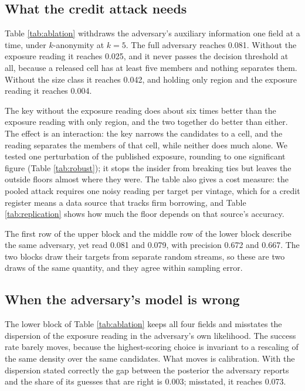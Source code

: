 \documentclass[11pt,a4paper]{article}
\theoremstyle{plain}
\theoremstyle{definition}
\theoremstyle{definition}
\theoremstyle{plain}
\begin{document}
\subsection{What the credit attack needs}\label{app:eval-extra}



Table \ref{tab:ablation} withdraws the adversary's auxiliary information one field
at a time, under $k$-anonymity at $k=5$. The full adversary reaches
0.081. Without the exposure reading it reaches
0.025, and it never passes the decision threshold at all,
because a released cell has at least five members and nothing separates them.
Without the size class it reaches 0.042, and holding only region and the
exposure reading it reaches 0.004.

The key without the exposure reading does about six times better than the
exposure reading with only region, and the two together do better than either.
The effect is an interaction: the key narrows the candidates to a cell, and the
reading separates the members of that cell, while neither does much alone. We
tested one perturbation of the published exposure, rounding to one significant
figure (Table \ref{tab:robust}); it stops the insider from breaking ties but
leaves the outside floors almost where they were. The table also gives a cost
measure: the pooled attack requires one noisy reading per target per vintage,
which for a credit register means a data source that tracks firm borrowing, and
Table \ref{tab:replication} shows how much the floor depends on that source's
accuracy.

The first row of the upper block and the middle row of the lower block describe
the same adversary, yet read 0.081 and 0.079, with precision 0.672 and 0.667. The
two blocks draw their targets from separate random streams, so these are two
draws of the same quantity, and they agree within sampling error.

\subsection{When the adversary's model is wrong}\label{sec:eval-shift}

The lower block of Table \ref{tab:ablation} keeps all four fields and misstates the
dispersion of the exposure reading in the adversary's own likelihood. The success
rate barely moves, because the highest-scoring choice is invariant to a rescaling
of the same density over the same candidates. What moves is calibration.
With the dispersion stated correctly the gap between the posterior the adversary
reports and the share of its guesses that are right is 0.003;
misstated, it reaches 0.073.
\end{document}
